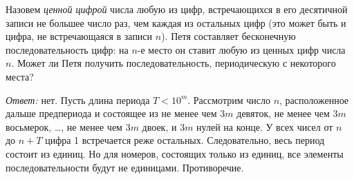 \problem
Назовем \emph{ценной цифрой} числа любую из цифр, встречающихся в его
десятичной записи не большее число раз, чем каждая из остальных цифр
(это может быть и цифра, не встречающаяся в записи $n$).
Петя составляет бесконечную последовательность цифр: на $n$-е место он ставит
любую из ценных цифр числа $n$.
Может ли Петя получить последовательность, периодическую с некоторого места?

\solution
\emph{Ответ:} нет.
Пусть длина периода $T < 10^m$.
Рассмотрим число $n$, расположенное дальше предпериода и состоящее из не менее
чем $3m$ девяток, не менее чем $3m$ восьмерок, \ldots, не менее чем $3m$ двоек,
и $3m$ нулей на конце.
У всех чисел от $n$ до  $n + T$ цифра 1 встречается реже остальных.
Следовательно, весь период состоит из единиц.
Но для номеров, состоящих только из единиц, все элементы последовательности
будут не единицами.
Противоречие.
\endproblem
